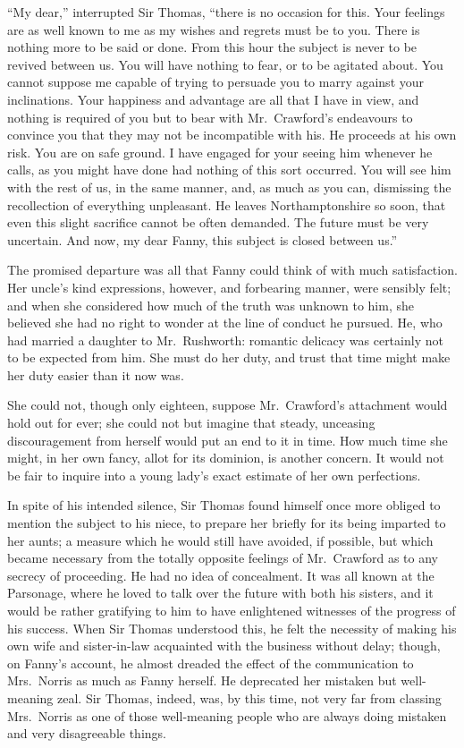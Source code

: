 ``My dear,'' interrupted Sir Thomas, ``there is no
occasion for this.  Your feelings are as well known
to me as my wishes and regrets must be to you.
There is nothing more to be said or done.  From this
hour the subject is never to be revived between us.
You will have nothing to fear, or to be agitated about.
You cannot suppose me capable of trying to persuade you
to marry against your inclinations.  Your happiness
and advantage are all that I have in view, and nothing is
required of you but to bear with Mr.\ Crawford's endeavours
to convince you that they may not be incompatible with his.
He proceeds at his own risk.  You are on safe ground.
I have engaged for your seeing him whenever he calls,
as you might have done had nothing of this sort occurred.
You will see him with the rest of us, in the same manner,
and, as much as you can, dismissing the recollection of
everything unpleasant.  He leaves Northamptonshire so soon,
that even this slight sacrifice cannot be often demanded.
The future must be very uncertain.  And now, my dear Fanny,
this subject is closed between us.''

The promised departure was all that Fanny could think
of with much satisfaction.  Her uncle's kind expressions,
however, and forbearing manner, were sensibly felt;
and when she considered how much of the truth was unknown
to him, she believed she had no right to wonder at the line
of conduct he pursued.  He, who had married a daughter
to Mr.\ Rushworth:  romantic delicacy was certainly not
to be expected from him.  She must do her duty, and trust
that time might make her duty easier than it now was.

She could not, though only eighteen, suppose Mr.\ Crawford's
attachment would hold out for ever; she could not
but imagine that steady, unceasing discouragement from
herself would put an end to it in time.  How much time
she might, in her own fancy, allot for its dominion,
is another concern.  It would not be fair to inquire
into a young lady's exact estimate of her own perfections.

In spite of his intended silence, Sir Thomas found himself
once more obliged to mention the subject to his niece,
to prepare her briefly for its being imparted to her aunts;
a measure which he would still have avoided, if possible,
but which became necessary from the totally opposite
feelings of Mr.\ Crawford as to any secrecy of proceeding.
He had no idea of concealment.  It was all known at
the Parsonage, where he loved to talk over the future
with both his sisters, and it would be rather gratifying
to him to have enlightened witnesses of the progress
of his success.  When Sir Thomas understood this, he felt
the necessity of making his own wife and sister-in-law
acquainted with the business without delay; though,
on Fanny's account, he almost dreaded the effect of the
communication to Mrs.\ Norris as much as Fanny herself.
He deprecated her mistaken but well-meaning zeal.
Sir Thomas, indeed, was, by this time, not very far from
classing Mrs.\ Norris as one of those well-meaning people
who are always doing mistaken and very disagreeable things.

